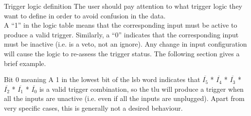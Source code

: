 \begin{alertinfo}{Trigger logic definition}
    The user should pay attention to what trigger logic they want to define in order to avoid confusion in the data.\\
    A ``1'' in the logic table means that the corresponding input must be active to produce a valid trigger. Similarly, a ``0'' indicates that the corresponding input must be inactive (i.e. is a veto, not an ignore). Any change in input configuration will cause the logic to re-assess the trigger status. The following section gives a brief example.\\
\end{alertinfo}

\begin{alertinfo}{Bit 0 meaning}
    A 1 in the lowest bit of the \gls{lsb} word indicates that $\overline{I_{5}}$ * $\overline{I_{4}}$ * $\overline{I_{3}}$ * $\overline{I_{2}}$ * $\overline{I_{1}}$ * $\overline{I_{0}}$ is a valid trigger combination, so the \gls{tlu} will produce a trigger when all the inputs are unactive (i.e. even if all the inputs are unplugged). Apart from very specific cases, this is generally not a desired behaviour.
\end{alertinfo}

